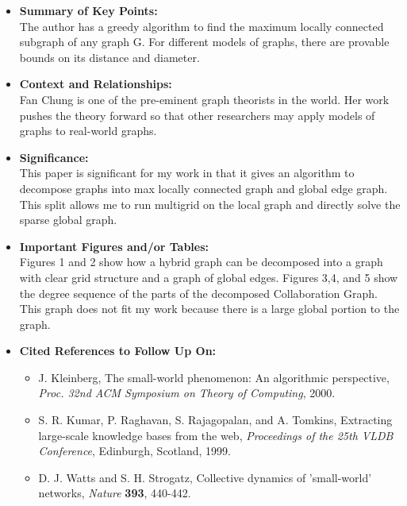 \documentclass{article}
\begin{document}
\begin{itemize}
\item{\textbf{Summary of Key Points:}}
\\
The author has a greedy algorithm to find the maximum locally connected subgraph of any graph G. For different models of graphs, there are provable bounds on its distance and diameter.

\item{\textbf{Context and Relationships:}}
\\
Fan Chung is one of the pre-eminent graph theorists in the world. Her work pushes the theory forward so that other researchers may apply models of graphs to real-world graphs.

\item{\textbf{Significance:}}
\\
This paper is significant for my work in that it gives an algorithm to decompose graphs into max locally connected graph and global edge graph. This split allows me to run multigrid on the local graph and directly solve the sparse global graph.

\item{\textbf{Important Figures and/or Tables:}}
\\
Figures 1 and 2 show how a hybrid graph can be decomposed into a graph with clear grid structure and a graph of global edges. Figures 3,4, and 5 show the degree sequence of the parts of the decomposed Collaboration Graph. This graph does not fit my work because there is a large global portion to the graph.

\item{\textbf{Cited References to Follow Up On:}}
\\
\begin{itemize}
\item
J. Kleinberg, The small-world phenomenon: An algorithmic perspective, \textit{Proc. 32nd ACM Symposium on Theory of Computing}, 2000.
\item
S. R. Kumar, P. Raghavan, S. Rajagopalan, and A. Tomkins, Extracting large-scale knowledge bases from the web, \textit{Proceedings of the 25th VLDB Conference}, Edinburgh, Scotland, 1999.
\item
D. J. Watts and S. H. Strogatz, Collective dynamics of 'small-world' networks, \textit{Nature} \textbf{393}, 440-442.
\end{itemize}
\end{itemize}
\end{document}

